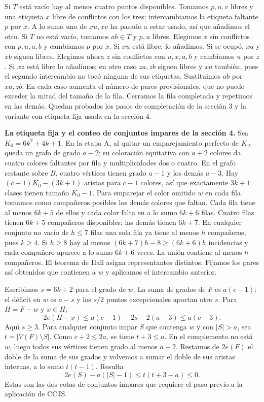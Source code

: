 \documentclass[spanish,11pt,a4paper]{article}
\begin{document}
Si \(T\) está vacío hay al menos cuatro puntos disponibles. Tomamos \(p,u,v\) libres y una etiqueta \(x\) libre de conflictos con los tres; intercambiamos la etiqueta faltante \(p\) por \(x\). A lo sumo uno de \(xu,xv\) ha pasado a estar usado, así que añadimos el otro. Si \(T\) no está vacío, tomamos \(ab\in T\) y \(p,u\) libres. Elegimos \(x\) sin conflictos con \(p,u,a,b\) y cambiamos \(p\) por \(x\). Si \(xu\) está libre, lo añadimos. Si se ocupó, \(xa\) y \(xb\) siguen libres. Elegimos ahora \(z\) sin conflictos con \(u,x,a,b\) y cambiamos \(u\) por \(z\). Si \(xz\) está libre lo añadimos; en otro caso \(za,zb\) siguen libres y \(xa\) también, pues el segundo intercambio no tocó ninguna de sus etiquetas. Sustituimos \(ab\) por \(xa,zb\). En cada caso aumenta el número de pares provisionales, que no puede exceder la mitad del tamaño de la fila. Cerramos la fila completada y repetimos en las demás. Quedan probados los pasos de completación de la sección 3 y la variante con etiqueta fija usada en la sección 4.

\textbf{La etiqueta fija y el conteo de conjuntos impares de la sección 4.} Sea \(K_0=6k^2+4k+1\). En la etapa A, al quitar un emparejamiento perfecto de \(K_A\) queda un grafo de grado \(a-2\); su coloración equitativa con \(a+2\) colores da cuatro colores faltantes por fila y multiplicidades dos o cuatro. En el grafo restante sobre \(B\), cuatro vértices tienen grado \(a-1\) y los demás \(a-3\). Hay \((c-1)K_0-(3k+1)\) aristas para \(c-1\) colores, así que exactamente \(3k+1\) clases tienen tamaño \(K_0-1\). Para emparejar el color omitido \(w\) en cada fila tomamos como compañeros posibles los demás colores que faltan. Cada fila tiene al menos \(6k+5\) de ellos y cada color falta en a lo sumo \(6k+6\) filas. Cuatro filas tienen \(6k+5\) compañeros disponibles; las demás tienen \(6k+7\). En cualquier conjunto no vacío de \(h\le7\) filas una sola fila ya tiene al menos \(h\) compañeros, pues \(k\ge4\). Si \(h\ge8\) hay al menos \((6k+7)h-8\ge(6k+6)h\) incidencias y cada compañero aparece a lo sumo \(6k+6\) veces. La unión contiene al menos \(h\) compañeros. El teorema de Hall asigna representantes distintos. Fijamos los pares así obtenidos que contienen a \(w\) y aplicamos el intercambio anterior.

Escribimos \(s=6k+2\) para el grado de \(w\). La suma de grados de \(F\) es \(a(c-1)\): el déficit en \(w\) es \(a-s\) y los \(s/2\) puntos excepcionales aportan otro \(s\). Para \(H=F-w\) y \(x\in H\), \[2e(H-x)\le a(c-1)-2s-2(a-3)\le a(c-3).\] Aquí \(s\ge3\). Para cualquier conjunto impar \(S\) que contenga \(w\) y con \(|S|>a\), sea \(t=|V(F)\setminus S|\). Como \(c+2\le2a\), se tiene \(t+3\le a\). En el complemento no está \(w\), luego todos sus vértices tienen grado al menos \(a-2\). Restamos de \(2e(F)\) el doble de la suma de sus grados y volvemos a sumar el doble de sus aristas internas, a lo sumo \(t(t-1)\). Resulta \[2e(S)-a(|S|-1)\le t(t+3-a)\le0.\] Estas son las dos cotas de conjuntos impares que requiere el paso previo a la aplicación de CCJS.
\end{document}
